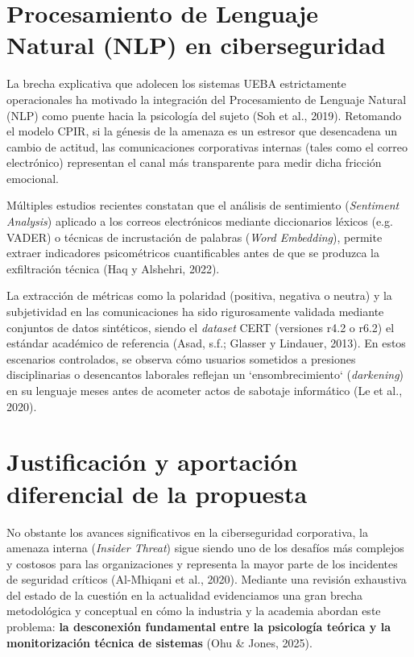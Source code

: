 \documentclass[IB]{TFUOC}%
\begin{document}
\section{Procesamiento de Lenguaje Natural (NLP) en ciberseguridad}

La brecha explicativa que adolecen los sistemas UEBA estrictamente operacionales ha motivado la integración del Procesamiento de Lenguaje Natural (NLP) como puente hacia la psicología del sujeto (Soh et al., 2019). Retomando el modelo CPIR, si la génesis de la amenaza es un estresor que desencadena un cambio de actitud, las comunicaciones corporativas internas (tales como el correo electrónico) representan el canal más transparente para medir dicha fricción emocional.

\medskip
\noindent Múltiples estudios recientes constatan que el análisis de sentimiento (\textit{Sentiment Analysis}) aplicado a los correos electrónicos mediante diccionarios léxicos (e.g. VADER) o técnicas de incrustación de palabras (\textit{Word Embedding}), permite extraer indicadores psicométricos cuantificables antes de que se produzca la exfiltración técnica (Haq y Alshehri, 2022).

\medskip
\noindent La extracción de métricas como la polaridad (positiva, negativa o neutra) y la subjetividad en las comunicaciones ha sido rigurosamente validada mediante conjuntos de datos sintéticos, siendo el \textit{dataset} CERT (versiones r4.2 o r6.2) el estándar académico de referencia (Asad, s.f.; Glasser y Lindauer, 2013). En estos escenarios controlados, se observa cómo usuarios sometidos a presiones disciplinarias o desencantos laborales reflejan un `ensombrecimiento` (\textit{darkening}) en su lenguaje meses antes de acometer actos de sabotaje informático (Le et al., 2020).

\section{Justificación y aportación diferencial de la propuesta}

No obstante los avances significativos en la ciberseguridad corporativa, la amenaza interna (\textit{Insider Threat}) sigue siendo uno de los desafíos más complejos y costosos para las organizaciones y representa la mayor parte de los incidentes de seguridad críticos (Al-Mhiqani et al., 2020). Mediante una revisión exhaustiva del estado de la cuestión en la actualidad evidenciamos una gran brecha metodológica y conceptual en cómo la industria y la academia abordan este problema: \textbf{la desconexión fundamental entre la psicología teórica y la monitorización técnica de sistemas} (Ohu \& Jones, 2025).
\end{document}
